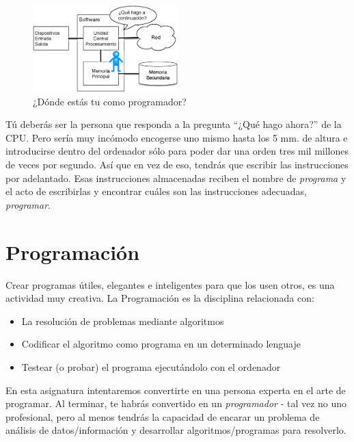 \begin{figure}
\centering
\includegraphics[width=0.5\textwidth]{images/arch2}
\caption{¿Dónde estás tu como programador?}
\label{fig:donde-estas}
\end{figure}

Tú deberás ser la persona que responda a la pregunta ``¿Qué hago
ahora?'' de la CPU. Pero sería muy incómodo encogerse uno mismo hasta
los 5 mm. de altura e introducirse dentro del ordenador sólo para poder
dar una orden tres mil millones de veces por segundo. Así que en vez de
eso, tendrás que escribir las instrucciones por adelantado. Esas
instrucciones almacenadas reciben el nombre de \emph{programa} y el acto
de escribirlas y encontrar cuáles son las instrucciones adecuadas,
\emph{programar}.

\hypertarget{programacion}{%
\section{Programación}\label{programacion}}

Crear programas útiles, elegantes e inteligentes para que los usen
otros, es una actividad muy creativa. La Programación es la disciplina
relacionada con:

\begin{itemize}[nosep]
\item
  La resolución de problemas mediante algoritmos
\item
  Codificar el algoritmo como programa en un determinado lenguaje
\item
  Testear (o probar) el programa ejecutándolo con el ordenador
\end{itemize}

En esta asignatura intentaremos convertirte en una persona
experta en el arte de programar. Al terminar, te habrás convertido en un
\emph{programador} - tal vez no uno profesional, pero al menos tendrás
la capacidad de encarar un problema de análisis de datos/información y
desarrollar algoritmos/programas para resolverlo.


